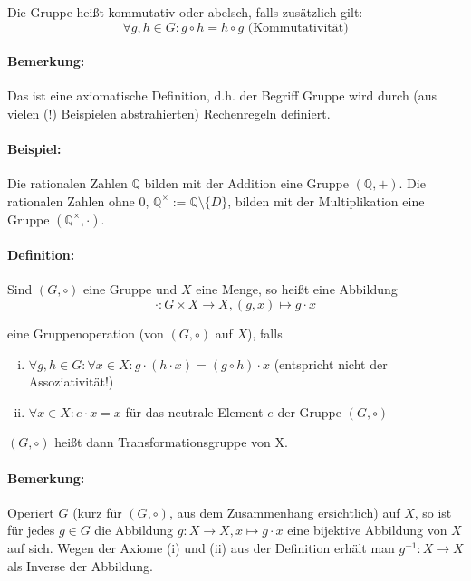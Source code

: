 	Die Gruppe heißt kommutativ oder abelsch, falls zusätzlich gilt:
	\begin{equation*}
		\forall g,h\in G: g\circ h = h\circ g \text{ (Kommutativität)}
	\end{equation*}

\paragraph{Bemerkung:}
	Das ist eine axiomatische Definition, d.h. der Begriff \glqq Gruppe\grqq{} wird durch (aus vielen (!) Beispielen abstrahierten) \glqq Rechenregeln\grqq{} definiert.
\paragraph{Beispiel:}
	Die rationalen Zahlen $\mathbb{Q}$ bilden mit der Addition eine Gruppe $(\mathbb{Q} ,+)$.
	Die rationalen Zahlen ohne $0$, $\mathbb{Q}^{\times} := \mathbb{Q}\setminus \{D\}$, bilden mit der Multiplikation eine Gruppe $(\mathbb{Q}^\times ,\cdot)$.

\paragraph{Definition:}
	Sind $(G,\circ )$ eine Gruppe und $X$ eine Menge, so heißt eine Abbildung
	\begin{equation*}
		\cdot : G\times X\to X, (g,x)\mapsto g\cdot x
	\end{equation*}
	
	eine Gruppenoperation (von $(G,\circ )$ auf $X$), falls

	\begin{enumerate}[(i)]
		\item $\forall g,h\in G :\forall x\in X: g\cdot (h\cdot x) = (g\circ h)\cdot x$ (entspricht nicht der Assoziativität!)
		\item $\forall x\in X: e\cdot x = x$ für das neutrale Element $e$ der Gruppe $(G,\circ )$
	\end{enumerate}
	$(G,\circ )$ heißt dann Transformationsgruppe von X.

\paragraph{Bemerkung:}
	Operiert $G$ (kurz für $(G,\circ )$, aus dem Zusammenhang ersichtlich) auf $X$, so ist für jedes $g\in G$ die Abbildung $g:X\to X, x\mapsto g\cdot x$ eine bijektive Abbildung von $X$ auf sich. Wegen der Axiome (i) und (ii) aus der Definition erhält man $g^{-1}: X\to X$ als Inverse der Abbildung.
